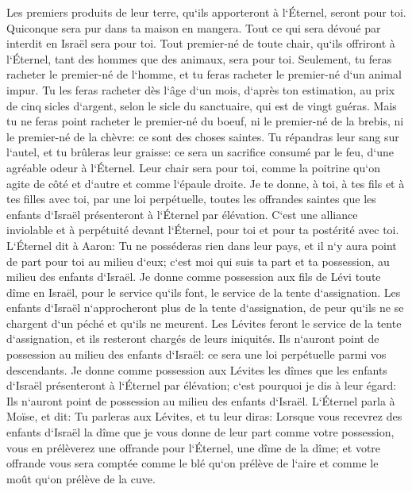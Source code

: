 \verse Les premiers produits de leur terre, qu`ils apporteront à l`Éternel, seront pour toi. Quiconque sera pur dans ta maison en mangera. 
\verse Tout ce qui sera dévoué par interdit en Israël sera pour toi. 
\verse Tout premier-né de toute chair, qu`ils offriront à l`Éternel, tant des hommes que des animaux, sera pour toi. Seulement, tu feras racheter le premier-né de l`homme, et tu feras racheter le premier-né d`un animal impur. 
\verse Tu les feras racheter dès l`âge d`un mois, d`après ton estimation, au prix de cinq sicles d`argent, selon le sicle du sanctuaire, qui est de vingt guéras. 
\verse Mais tu ne feras point racheter le premier-né du boeuf, ni le premier-né de la brebis, ni le premier-né de la chèvre: ce sont des choses saintes. Tu répandras leur sang sur l`autel, et tu brûleras leur graisse: ce sera un sacrifice consumé par le feu, d`une agréable odeur à l`Éternel. 
\verse Leur chair sera pour toi, comme la poitrine qu`on agite de côté et d`autre et comme l`épaule droite. 
\verse Je te donne, à toi, à tes fils et à tes filles avec toi, par une loi perpétuelle, toutes les offrandes saintes que les enfants d`Israël présenteront à l`Éternel par élévation. C`est une alliance inviolable et à perpétuité devant l`Éternel, pour toi et pour ta postérité avec toi. 
\verse L`Éternel dit à Aaron: Tu ne posséderas rien dans leur pays, et il n`y aura point de part pour toi au milieu d`eux; c`est moi qui suis ta part et ta possession, au milieu des enfants d`Israël. 
\verse Je donne comme possession aux fils de Lévi toute dîme en Israël, pour le service qu`ils font, le service de la tente d`assignation. 
\verse Les enfants d`Israël n`approcheront plus de la tente d`assignation, de peur qu`ils ne se chargent d`un péché et qu`ils ne meurent. 
\verse Les Lévites feront le service de la tente d`assignation, et ils resteront chargés de leurs iniquités. Ils n`auront point de possession au milieu des enfants d`Israël: ce sera une loi perpétuelle parmi vos descendants. 
\verse Je donne comme possession aux Lévites les dîmes que les enfants d`Israël présenteront à l`Éternel par élévation; c`est pourquoi je dis à leur égard: Ils n`auront point de possession au milieu des enfants d`Israël. 
\verse L`Éternel parla à Moïse, et dit: 
\verse Tu parleras aux Lévites, et tu leur diras: Lorsque vous recevrez des enfants d`Israël la dîme que je vous donne de leur part comme votre possession, vous en prélèverez une offrande pour l`Éternel, une dîme de la dîme; 
\verse et votre offrande vous sera comptée comme le blé qu`on prélève de l`aire et comme le moût qu`on prélève de la cuve. 
